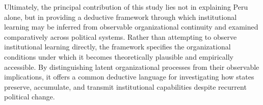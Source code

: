 \documentclass[doc, 12pt, a4paper,floatsintext]{apa7}
\begin{document}
Ultimately, the principal contribution of this study lies not in explaining Peru alone, but in providing a deductive framework through which institutional learning may be inferred from observable organizational continuity and examined comparatively across political systems. Rather than attempting to observe institutional learning directly, the framework specifies the organizational conditions under which it becomes theoretically plausible and empirically accessible. By distinguishing latent organizational processes from their observable implications, it offers a common deductive language for investigating how states preserve, accumulate, and transmit institutional capabilities despite recurrent political change.

\printbibliography
\end{document}

